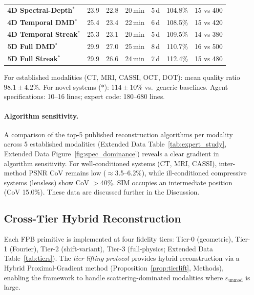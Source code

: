 \documentclass[11pt,a4paper]{article}
\newcommand{\eps}{\varepsilon}
\begin{document}
\begin{table}[htbp]
\begin{tabular}{@{}lcccccc@{}}
\textbf{4D Spectral-Depth}$^*$ & 23.9 & 22.8 & 20\,min & 5\,d & 104.8\% & 15 vs 400 \\
\textbf{4D Temporal DMD}$^*$ & 25.4 & 23.4 & 22\,min & 6\,d & 108.5\% & 15 vs 420 \\
\textbf{4D Temporal Streak}$^*$ & 25.3 & 23.1 & 20\,min & 5\,d & 109.5\% & 14 vs 380 \\
\textbf{5D Full DMD}$^*$ & 29.9 & 27.0 & 25\,min & 8\,d & 110.7\% & 16 vs 500 \\
\textbf{5D Full Streak}$^*$ & 29.9 & 26.6 & 24\,min & 7\,d & 112.4\% & 15 vs 480 \\
\bottomrule
\end{tabular}
\end{table}

For established modalities (CT, MRI, CASSI, OCT, DOT): mean quality ratio $98.1 \pm 4.2$\%.  For novel systems ($*$): $114 \pm 10$\% vs.\ generic baselines.  Agent specifications: 10--16 lines; expert code: 180--680 lines.

\paragraph{Algorithm sensitivity.}
A comparison of the top-5 published reconstruction algorithms per modality across 5 established modalities (Extended Data Table~\ref{tab:expert_study}, Extended Data Figure~\ref{fig:spec_dominance}) reveals a clear gradient in algorithm sensitivity.  For well-conditioned systems (CT, MRI, CASSI), inter-method PSNR CoV remains low ($\approx$3.5--6.2\%), while ill-conditioned compressive systems (lensless) show CoV $>$40\%.  SIM occupies an intermediate position (CoV 15.0\%).  These data are discussed further in the Discussion.

\subsection{Cross-Tier Hybrid Reconstruction}
\label{sec:tierlifting}

Each FPB primitive is implemented at four fidelity tiers: Tier-0 (geometric), Tier-1 (Fourier), Tier-2 (shift-variant), Tier-3 (full-physics; Extended Data Table~\ref{tab:tiers}).  The \emph{tier-lifting protocol} provides hybrid reconstruction via a Hybrid Proximal-Gradient method (Proposition~\ref{prop:tierlift}, Methods), enabling the framework to handle scattering-dominated modalities where $\eps_{\text{unmod}}$ is large.
\end{document}
